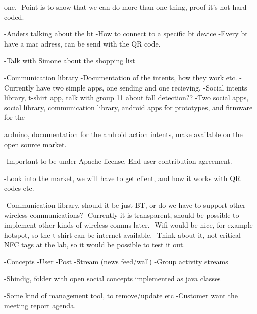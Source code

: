    one.
  -Point is to show that we can do more than one thing, proof it's not hard coded.


-Anders talking about the bt
 -How to connect to a specific bt device
 -Every bt have a mac adress, can be send with the QR code.


-Talk with Simone about the shopping list




-Communication library
-Documentation of the intents, how they work etc.
 -Currently have two simple apps, one sending and one recieving.
-Social intents library, t-shirt app, talk with group 11 about fall detection??
 -Two social apps, social library, communication library, android apps for prototypes, and firmware for the   


arduino, documentation for the android action intents, make available on the open source market.


-Important to be under Apache license. End user contribution agreement.


-Look into the market, we will have to get client, and how it works with QR codes etc.


-Communication library, should it be just BT, or do we have to support other wireless communications?
 -Currently it is transparent, should be possible to implement other kinds of wireless comms later.
  -Wifi would be nice, for example hotspot, so the t-shirt can be internet available.
  -Think about it, not critical
 -NFC tags at the lab, so it would be possible to test it out.
 
-Concepts
 -User
 -Post
 -Stream (news feed/wall)
 -Group activity streams
 
 -Shindig, folder with open social concepts implemented as java classes


-Some kind of management tool, to remove/update etc
 -Customer want the meeting report agenda.